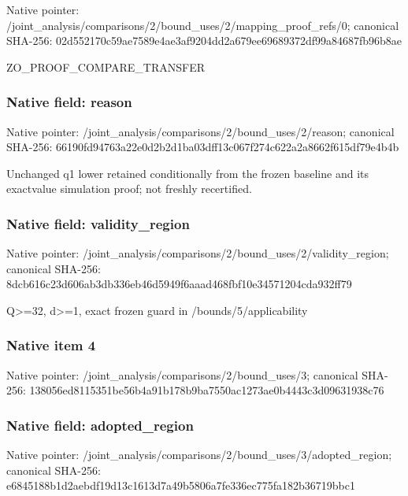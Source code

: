 \documentclass[10pt,a4paper]{article}
\begin{document}
Native pointer: /joint\_analysis/comparis\allowbreak{}ons/2/bound\_uses/2/mappi\allowbreak{}ng\_proof\_refs/0; canonical SHA-256: 02d552170c59ae7589e4ae3a\allowbreak{}f9204dd2a679ee69689372df\allowbreak{}99a84687fb96b8ae


ZO\_PROOF\_COMPARE\_TRANSFER


\subsubsection{Native field: reason}


Native pointer: /joint\_analysis/comparis\allowbreak{}ons/2/bound\_uses/2/reaso\allowbreak{}n; canonical SHA-256: 66190fd94763a22e0d2b2d1b\allowbreak{}a03dff13c067f274c622a2a8\allowbreak{}662f615df79e4b4b


Unchanged q1 lower retained conditionally from the frozen baseline and its exactvalue simulation proof; not freshly recertified.


\subsubsection{Native field: validity\_region}


Native pointer: /joint\_analysis/comparis\allowbreak{}ons/2/bound\_uses/2/valid\allowbreak{}ity\_region; canonical SHA-256: 8dcb616c23d606ab3db336eb\allowbreak{}46d5949f6aaad468fbf10e34\allowbreak{}571204cda932ff79


Q>=32, d>=1, exact frozen guard in /bounds/5/applicability


\subsubsection{Native item 4}


Native pointer: /joint\_analysis/comparis\allowbreak{}ons/2/bound\_uses/3; canonical SHA-256: 138056ed8115351be56b4a91\allowbreak{}b178b9ba7550ac1273ae0b44\allowbreak{}43c3d09631938c76



\subsubsection{Native field: adopted\_region}


Native pointer: /joint\_analysis/comparis\allowbreak{}ons/2/bound\_uses/3/adopt\allowbreak{}ed\_region; canonical SHA-256: e6845188b1d2aebdf19d13c1\allowbreak{}613d7a49b5806a7fe336ec77\allowbreak{}5fa182b36719bbc1
\end{document}
